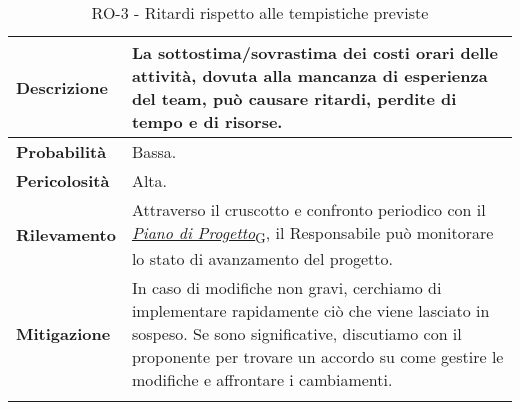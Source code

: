 \begin{longtable}{ | l | p{12cm} | }
	\hline
	\textbf{Descrizione}  & La sottostima/sovrastima dei costi orari delle attività, dovuta alla mancanza di esperienza del team, può causare ritardi, perdite di tempo e di risorse.                                                                                                          \\
	\hline
	\textbf{Probabilità}  & Bassa.                                                                                                                                                                                                                                                             \\
	\hline
	\textbf{Pericolosità} & Alta.                                                                                                                                                                                                                                                              \\
	\hline
	\textbf{Rilevamento}  & Attraverso il cruscotto e confronto periodico con il \href{https://7last.github.io/docs/rtb/documentazione-interna/glossario#piano-di-progetto}{\textit{Piano di Progetto}\textsubscript{G}}, il Responsabile può monitorare lo stato di avanzamento del progetto. \\
	\hline
	\textbf{Mitigazione}  & In caso di modifiche non gravi, cerchiamo di implementare rapidamente ciò che viene lasciato in sospeso. Se sono significative, discutiamo con il proponente per trovare un accordo su come gestire le modifiche e affrontare i cambiamenti.                       \\
	\hline
	\caption{RO-3 - Ritardi rispetto alle tempistiche previste}
\end{longtable}

\newpage


